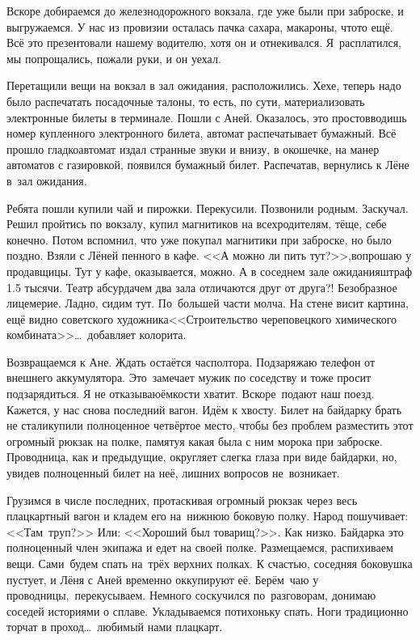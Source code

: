 Вскоре добираемся до железнодорожного вокзала, где уже были при заброске, и выгружаемся. У нас из провизии осталась пачка сахара, макароны, что\sdash то ещё. Всё это презентовали нашему водителю, хотя он и отнекивался. Я~расплатился, мы попрощались, пожали руки, и он уехал. 

Перетащили вещи на вокзал в зал ожидания, расположились. Хе\sdash хе, теперь надо было распечатать посадочные талоны, то есть, по сути, материализовать электронные билеты в терминале. Пошли с Аней. Оказалось, это просто\mdash вводишь номер купленного электронного билета, автомат распечатывает бумажный. Всё прошло гладко\mdash автомат издал странные звуки и внизу, в окошечке, на манер автоматов с газировкой, появился бумажный билет. Распечатав, вернулись к Лёне в~зал ожидания. 

Ребята пошли купили чай и пирожки. Перекусили. Позвонили родным. Заскучал. Решил пройтись по вокзалу, купил магнитиков на всех\mdash родителям, тёще, себе конечно. Потом вспомнил, что уже покупал магнитики при заброске, но было поздно. Взяли с Лёней пенного в кафе. <<А можно ли пить тут?>>,\mdash вопрошаю у продавщицы. Тут у кафе, оказывается, можно. А в соседнем зале ожидания\mdash штраф 1.5 тысячи. Театр абсурда\mdash чем два зала отличаются друг от друга?! Безобразное лицемерие. Ладно, сидим тут. По~большей части молча. На стене висит картина, ещё видно советского художника\mdash <<Строительство череповецкого химического комбината>>\ldots~добавляет колорита. 

Возвращаемся к Ане. Ждать остаётся час\sdash полтора. Подзаряжаю телефон от внешнего аккумулятора. Это~замечает мужик по соседству и тоже просит подзарядиться. Я не отказываю\mdash ёмкости хватит. Вскоре~подают наш поезд. Кажется, у нас снова последний вагон. Идём к хвосту. Билет на байдарку брать не стали\mdash купили полноценное четвёртое место, чтобы без проблем разместить этот огромный рюкзак на полке, памятуя какая была с ним морока при заброске. Проводница, как и предыдущие, округляет слегка глаза при виде байдарки, но, увидев полноценный билет на неё, лишних вопросов не~возникает.
 
Грузимся в числе последних, протаскивая огромный рюкзак через весь плацкартный вагон и кладем его на~нижнюю боковую полку. Народ пошучивает: <<Там~труп?>> Или: <<Хороший был товарищ?>>. Как низко. Байдарка это полноценный член экипажа и едет на своей полке. Размещаемся, распихиваем вещи. Сами~будем спать на~трёх верхних полках. К счастью, соседняя боковушка пустует, и Лёня с Аней временно оккупируют её. Берём~чаю у проводницы,~перекусываем. Немного соскучился по~разговорам, донимаю соседей историями о сплаве. Укладываемся потихоньку спать. Ноги традиционно торчат в проход\ldots~любимый нами плацкарт.

